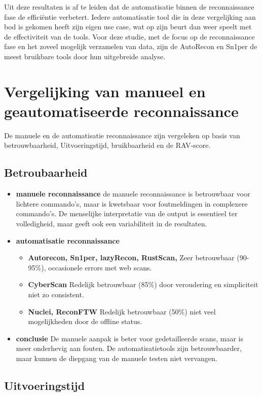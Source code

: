 Uit deze resultaten is af te leiden dat de automatisatie binnen de reconnaissance fase de efficiëntie verbetert. 
Iedere automatisatie tool die in deze vergelijking aan bod is gekomen heeft zijn eigen use case, wat op zijn beurt dan weer speelt met de effectiviteit van de tools.
Voor deze studie, met de focus op de reconnaissance fase en het zoveel mogelijk verzamelen van data, zijn de AutoRecon en Sn1per de meest bruikbare tools door hun uitgebreide analyse.

\section{Vergelijking van manueel en geautomatiseerde reconnaissance}
De manuele en de automatisatie reconnaissance zijn vergeleken op basis van betrouwbaarheid, Uitvoeringstijd, bruikbaarheid en de RAV-score.
\subsection{Betroubaarheid}

\begin{itemize}
  \item \textbf{manuele reconnaissance} de manuele reconnaissance is betrouwbaar voor lichtere commando's, maar is kwetsbaar voor foutmeldingen in complexere commando's. De menselijke interpretatie van de output is essentieel ter volledigheid, maar geeft ook een variabiliteit in de resultaten.
  \item \textbf{automatisatie reconnaissance} 
  \begin{itemize}
    \item \textbf{Autorecon, Sn1per, lazyRecon, RustScan, } Zeer betrouwbaar (90-95\%), occasionele errors met web scans.
    \item \textbf{CyberScan} Redelijk betrouwbaar (85\%) door veroudering en simpliciteit niet zo consistent.
    \item \textbf{Nuclei, ReconFTW} Redelijk betrouwbaar (50\%) niet veel mogelijkheden door de offline status.
  \end{itemize}
  \item \textbf{conclusie} De manuele aanpak is beter voor gedetailleerde scans, maar is meer onderhevig aan fouten. De automatisatietools zijn betrouwbaarder, maar kunnen de diepgang van de manuele testen niet vervangen.
\end{itemize}

\subsection{Uitvoeringstijd}

